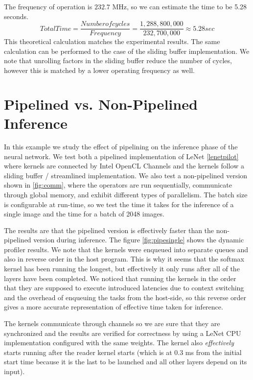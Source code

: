 The frequency of operation is $232.7$ MHz, so we can estimate the time to be 5.28 seconds.
\begin{equation}
 Total Time = \frac{Number of cycles}{Frequency} = \frac{1,288,800,000}{232,700,000}  \approx 5.28 sec
\end{equation}
This theoretical calculation matches the experimental results. The same calculation can be performed to the case of the sliding buffer implementation. We note that unrolling factors in the sliding buffer reduce the number of cycles, however this is matched by a lower operating frequency as well.




\section{Pipelined vs. Non-Pipelined Inference}

In this example we study the effect of pipelining on the inference phase of the neural network. We test both a pipelined implementation of LeNet \ref{lenetpilot} where kernels are connected by Intel OpenCL Channels and the kernels follow a sliding buffer / streamlined implementation. We also test a non-pipelined version shown in \ref{fig:comm}, where the operators are run sequentially, communicate through global memory, and exhibit different types of parallelism. The batch size is configurable at run-time, so we test the time it takes for the inference of a single image and the time for a batch of 2048 images. 

The results are that the pipelined version is effectively faster than the non-pipelined version during inference. The figure \ref{fig:pipesingle} shows the dynamic profiler results. We note that the kernels were enqueued into separate queues and also in reverse order in the host program. This is why it seems that the softmax kernel has been running the longest, but effectively it only runs after all of the layers have been completed. We noticed that running the kernels in the order that they are supposed to execute introduced latencies due to context switching and the overhead of enqueuing the tasks from the host-side, so this reverse order gives a more accurate representation of effective time taken for inference. 

The kernels communicate through channels so we are sure that they are synchronized and the results are verified for correctness by using a LeNet CPU implementation configured with the same weights. The kernel also \emph{effectively} starts running after the reader kernel starts (which is at 0.3 ms from the initial start time because it is the last to be launched and all other layers depend on its input). 


